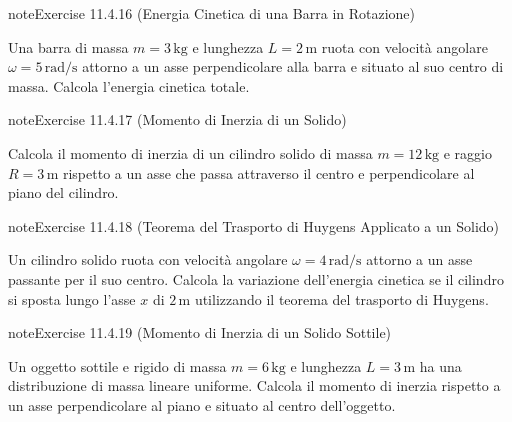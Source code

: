\documentclass[letterpaper,10pt,italian]{jupyterBook}
\begin{document}
\begin{sphinxadmonition}{note}{Exercise 11.4.16 (Energia Cinetica di una Barra in Rotazione)}



\sphinxAtStartPar
Una barra di massa \(m = 3 \, \text{kg}\) e lunghezza \(L = 2 \, \text{m}\) ruota con velocità angolare \(\omega = 5 \, \text{rad/s}\) attorno a un asse perpendicolare alla barra e situato al suo centro di massa. Calcola l’energia cinetica totale.
\end{sphinxadmonition}
 \label{exercise:ch/mechanics/inertia-problems-exercise-16}

\begin{sphinxadmonition}{note}{Exercise 11.4.17 (Momento di Inerzia di un Solido)}



\sphinxAtStartPar
Calcola il momento di inerzia di un cilindro solido di massa \(m = 12 \, \text{kg}\) e raggio \(R = 3 \, \text{m}\) rispetto a un asse che passa attraverso il centro e perpendicolare al piano del cilindro.
\end{sphinxadmonition}
 \label{exercise:ch/mechanics/inertia-problems-exercise-17}

\begin{sphinxadmonition}{note}{Exercise 11.4.18 (Teorema del Trasporto di Huygens Applicato a un Solido)}



\sphinxAtStartPar
Un cilindro solido ruota con velocità angolare \(\omega = 4 \, \text{rad/s}\) attorno a un asse passante per il suo centro. Calcola la variazione dell’energia cinetica se il cilindro si sposta lungo l’asse \(x\) di \(2 \, \text{m}\) utilizzando il teorema del trasporto di Huygens.
\end{sphinxadmonition}
 \label{exercise:ch/mechanics/inertia-problems-exercise-18}

\begin{sphinxadmonition}{note}{Exercise 11.4.19 (Momento di Inerzia di un Solido Sottile)}



\sphinxAtStartPar
Un oggetto sottile e rigido di massa \(m = 6 \, \text{kg}\) e lunghezza \(L = 3 \, \text{m}\) ha una distribuzione di massa lineare uniforme. Calcola il momento di inerzia rispetto a un asse perpendicolare al piano e situato al centro dell’oggetto.
\end{sphinxadmonition}
 \label{exercise:ch/mechanics/inertia-problems-exercise-19}
\end{document}
